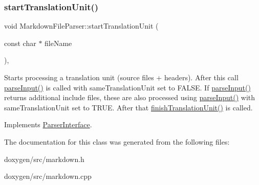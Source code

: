 \mbox{\label{class_markdown_file_parser_a82d0d8fad0f6772a9862eb3d9190127d}} 
\subsubsection{\texorpdfstring{startTranslationUnit()}{startTranslationUnit()}}
{\footnotesize\ttfamily void Markdown\+File\+Parser\+::start\+Translation\+Unit (\begin{DoxyParamCaption}\item[{const char $\ast$}]{file\+Name }\end{DoxyParamCaption})\hspace{0.3cm}{\ttfamily [inline]}, {\ttfamily [virtual]}}

Starts processing a translation unit (source files + headers). After this call \mbox{\hyperlink{class_markdown_file_parser_a56e4994924ce8ac7710e2a1da0f98807}{parse\+Input()}} is called with same\+Translation\+Unit set to F\+A\+L\+SE. If \mbox{\hyperlink{class_markdown_file_parser_a56e4994924ce8ac7710e2a1da0f98807}{parse\+Input()}} returns additional include files, these are also processed using \mbox{\hyperlink{class_markdown_file_parser_a56e4994924ce8ac7710e2a1da0f98807}{parse\+Input()}} with same\+Translation\+Unit set to T\+R\+UE. After that \mbox{\hyperlink{class_markdown_file_parser_adaf4aeedc27abe4dd8cc4a58d59b298f}{finish\+Translation\+Unit()}} is called. 

Implements \mbox{\hyperlink{class_parser_interface_a72478f87ead5fde10d7d6bbe32a73024}{Parser\+Interface}}.



The documentation for this class was generated from the following files\+:\begin{DoxyCompactItemize}
\item 
doxygen/src/markdown.\+h\item 
doxygen/src/markdown.\+cpp\end{DoxyCompactItemize}
